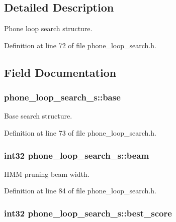 \subsection{Detailed Description}
Phone loop search structure. 

Definition at line 72 of file phone\+\_\+loop\+\_\+search.\+h.



\subsection{Field Documentation}
\subsubsection[{base}]{ phone\+\_\+loop\+\_\+search\+\_\+s\+::base}\label{structphone__loop__search__s_aea1cf9ffda814f681b57f32c1f8cc3b1}


Base search structure. 



Definition at line 73 of file phone\+\_\+loop\+\_\+search.\+h.

\subsubsection[{beam}]{\setlength{\rightskip}{0pt plus 5cm}int32 phone\+\_\+loop\+\_\+search\+\_\+s\+::beam}\label{structphone__loop__search__s_a1aa6103c72ce8159bd21bfa4f97feff3}


H\+M\+M pruning beam width. 



Definition at line 84 of file phone\+\_\+loop\+\_\+search.\+h.

\subsubsection[{best\+\_\+score}]{\setlength{\rightskip}{0pt plus 5cm}int32 phone\+\_\+loop\+\_\+search\+\_\+s\+::best\+\_\+score}\label{structphone__loop__search__s_af6bf0231db2587a3f7ffa3f838b84db5}


